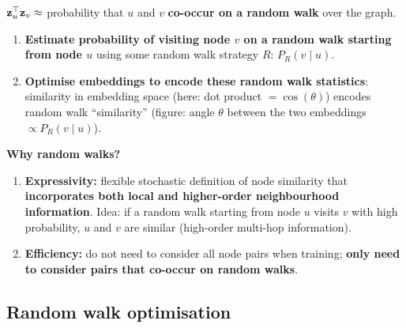 \begin{keyidea}
  $\mathbf{z}_u^{\top}\mathbf{z}_v\approx$ probability that $u$ and $v$ \textbf{co-occur on a
  random walk} over the graph.
\end{keyidea}
\begin{enumerate}
  \item \textbf{Estimate probability of visiting node $v$ on a random walk
    starting from node $u$} using some random walk strategy $R$: $P_R(v\mid u)$.
  \item \textbf{Optimise embeddings to encode these random walk statistics}:
    similarity in embedding space (here: dot product $=\cos(\theta)$) encodes
    random walk ``similarity'' (figure: angle $\theta$ between the two
    embeddings $\propto P_R(v\mid u)$).
\end{enumerate}
\textbf{Why random walks?}
\begin{enumerate}
  \item \textbf{Expressivity:} flexible stochastic definition of node similarity
    that \textbf{incorporates both local and higher-order neighbourhood
    information}. Idea: if a random walk starting from node $u$ visits $v$ with
    high probability, $u$ and $v$ are similar (high-order multi-hop information).
  \item \textbf{Efficiency:} do not need to consider all node pairs when
    training; \textbf{only need to consider pairs that co-occur on random walks}.
\end{enumerate}

\subsection{Random walk optimisation}\label{sec:lec02-objective}

